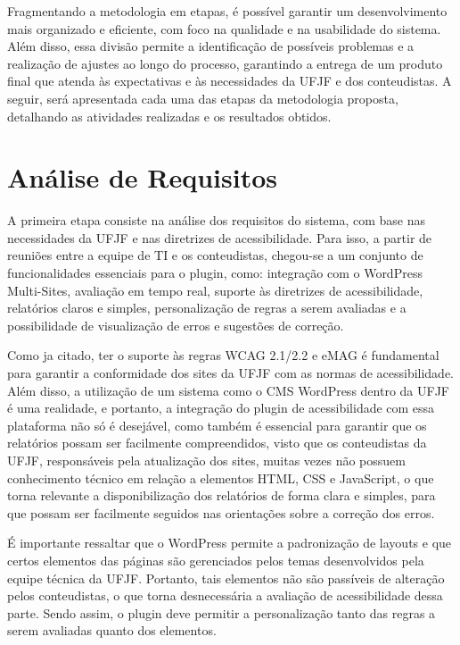 \documentclass[
    12pt,
    a4paper,
    oneside,
    brazil,
    english
]{article}
\begin{document}
Fragmentando a metodologia em etapas, é possível garantir um desenvolvimento
mais organizado e eficiente, com foco na qualidade e na usabilidade do sistema.
Além disso, essa divisão permite a identificação de possíveis problemas
e a realização de ajustes ao longo do processo, garantindo a entrega de um
produto final que atenda às expectativas e às necessidades da UFJF e dos
conteudistas. A seguir, será apresentada cada uma das etapas da metodologia
proposta, detalhando as atividades realizadas e os resultados obtidos.

\section*{Análise de Requisitos}
A primeira etapa consiste na análise dos requisitos do sistema, com base nas
necessidades da UFJF e nas diretrizes de acessibilidade. Para isso, a partir
de reuniões entre a equipe de TI e os conteudistas, chegou-se a um conjunto de
funcionalidades essenciais para o plugin, como: integração com o WordPress
Multi-Sites, avaliação em tempo real, suporte às diretrizes de acessibilidade,
relatórios claros e simples, personalização de regras a serem avaliadas e a
possibilidade de visualização de erros e sugestões de correção.

Como ja citado, ter o suporte às regras WCAG 2.1/2.2 e eMAG é fundamental para
garantir a conformidade dos sites da UFJF com as normas de acessibilidade.
Além disso, a utilização de um sistema como o CMS WordPress dentro da UFJF
é uma realidade, e portanto, a integração do plugin de acessibilidade com
essa plataforma não só é desejável, como também é essencial para garantir
que os relatórios possam ser facilmente compreendidos, visto que os
conteudistas da UFJF, responsáveis pela atualização dos sites, muitas
vezes não possuem conhecimento técnico em relação a elementos HTML,
CSS e JavaScript, o que torna relevante a disponibilização dos
relatórios de forma clara e simples, para que possam ser facilmente seguidos nas orientações sobre a
correção dos erros.

É importante ressaltar que o WordPress permite a padronização de layouts
e que certos elementos das páginas são gerenciados pelos temas desenvolvidos pela
equipe técnica da UFJF. Portanto, tais elementos não são passíveis de alteração
pelos conteudistas, o que torna desnecessária a avaliação de acessibilidade dessa parte.
Sendo assim, o plugin deve permitir a
personalização tanto das regras a serem avaliadas quanto dos elementos.
\end{document}
